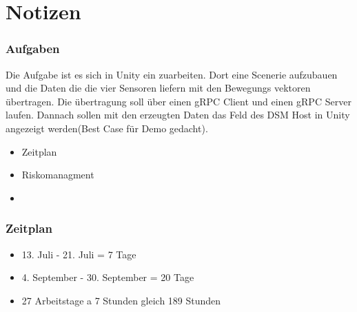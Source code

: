 
\chapter{Notizen}
\subsection{Aufgaben}
Die Aufgabe ist es sich in Unity ein zuarbeiten. Dort eine Scenerie aufzubauen und die Daten die die vier Sensoren liefern mit den Bewegungs vektoren übertragen.
Die übertragung soll über einen gRPC Client und einen gRPC Server laufen. Dannach sollen mit den erzeugten Daten das Feld des DSM Host in Unity angezeigt werden(Best Case für Demo gedacht).
\begin{itemize}
    \item Zeitplan
    \item Riskomanagment
    \item 
\end{itemize}
\subsection{Zeitplan}

\begin{itemize}
    \item 13. Juli - 21. Juli = 7 Tage
    \item 4. September - 30. September = 20 Tage
    \item 27 Arbeitstage a 7 Stunden gleich 189 Stunden
\end{itemize}




